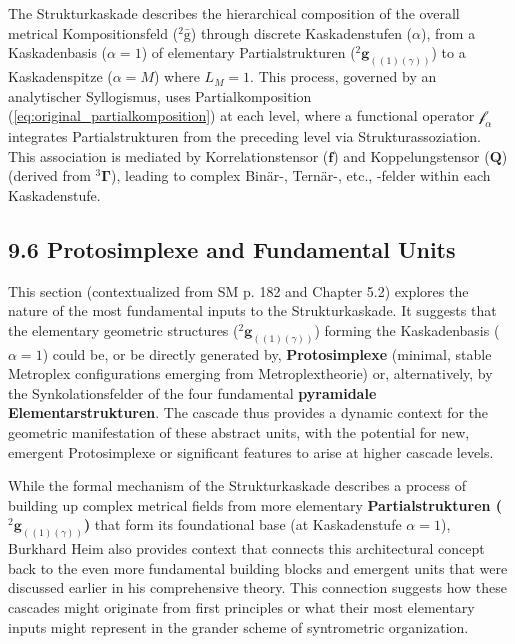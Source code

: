 \documentclass[12pt]{article}
\newcommand{\kompositionsfeld}{{}^2\bar{\mathrm{g}}}
\newcommand{\partialstruktur}[1]{{}^2\mathbf{g}_{(#1)}}
\newcommand{\fundamentalkondensor}{{}^3\bm{\Gamma}}
\newcommand{\korrelationstensor}{\mathbf{f}}
\newcommand{\koppelungstensor}{\mathbf{Q}}
\newcommand{\kaskadenstufe}{\alpha}
\begin{document}
The Strukturkaskade describes the hierarchical composition of the overall metrical Kompositionsfeld (\(\kompositionsfeld\)) through discrete Kaskadenstufen (\(\kaskadenstufe\)), from a Kaskadenbasis (\(\kaskadenstufe=1\)) of elementary Partialstrukturen (\(\partialstruktur{(1)(\gamma)}\)) to a Kaskadenspitze (\(\kaskadenstufe=M\)) where $L_M=1$. This process, governed by an analytischer Syllogismus, uses Partialkomposition (\eqref{eq:original_partialkomposition}) at each level, where a functional operator \(\mathcal{f}_\alpha\) integrates Partialstrukturen from the preceding level via Strukturassoziation. This association is mediated by Korrelationstensor (\(\korrelationstensor\)) and Koppelungstensor (\(\koppelungstensor\)) (derived from \(\fundamentalkondensor\)), leading to complex Binär-, Ternär-, etc., -felder within each Kaskadenstufe.

\subsection{9.6 Protosimplexe and Fundamental Units}
\label{sec:cascade_protosimplexe}

This section (contextualized from SM p. 182 and Chapter 5.2) explores the nature of the most fundamental inputs to the Strukturkaskade. It suggests that the elementary geometric structures (\(\partialstruktur{(1)(\gamma)}\)) forming the Kaskadenbasis (\(\kaskadenstufe=1\)) could be, or be directly generated by, \textbf{Protosimplexe} (minimal, stable Metroplex configurations emerging from Metroplextheorie) or, alternatively, by the Synkolationsfelder of the four fundamental \textbf{pyramidale Elementarstrukturen}. The cascade thus provides a dynamic context for the geometric manifestation of these abstract units, with the potential for new, emergent Protosimplexe or significant features to arise at higher cascade levels.

While the formal mechanism of the Strukturkaskade describes a process of building up complex metrical fields from more elementary \textbf{Partialstrukturen (\(\partialstruktur{(1)(\gamma)}\))} that form its foundational base (at Kaskadenstufe \( \kaskadenstufe=1 \)), Burkhard Heim also provides context that connects this architectural concept back to the even more fundamental building blocks and emergent units that were discussed earlier in his comprehensive theory. This connection suggests how these cascades might originate from first principles or what their most elementary inputs might represent in the grander scheme of syntrometric organization.
\end{document}
